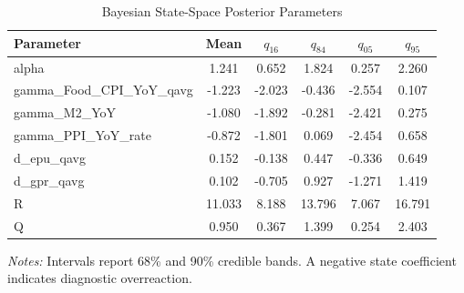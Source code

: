 \begin{table}[!htbp]
\centering
\begin{threeparttable}
 \caption{Bayesian State-Space Posterior Parameters}
 \label{tab:ssm_posterior_params}
\begin{tabular}{lccccc}
\toprule
Parameter & Mean & $q_{16}$ & $q_{84}$ & $q_{05}$ & $q_{95}$ \\
\midrule
alpha & 1.241 & 0.652 & 1.824 & 0.257 & 2.260 \\
gamma\_Food\_CPI\_YoY\_qavg & -1.223 & -2.023 & -0.436 & -2.554 & 0.107 \\
gamma\_M2\_YoY & -1.080 & -1.892 & -0.281 & -2.421 & 0.275 \\
gamma\_PPI\_YoY\_rate & -0.872 & -1.801 & 0.069 & -2.454 & 0.658 \\
d\_epu\_qavg & 0.152 & -0.138 & 0.447 & -0.336 & 0.649 \\
d\_gpr\_qavg & 0.102 & -0.705 & 0.927 & -1.271 & 1.419 \\
R & 11.033 & 8.188 & 13.796 & 7.067 & 16.791 \\
Q & 0.950 & 0.367 & 1.399 & 0.254 & 2.403 \\
\bottomrule
\end{tabular}
\begin{tablenotes}[flushleft]
\footnotesize
\item \textit{Notes:} Intervals report 68\% and 90\% credible bands. A negative state coefficient indicates diagnostic overreaction.
\end{tablenotes}
\end{threeparttable}
\end{table}
